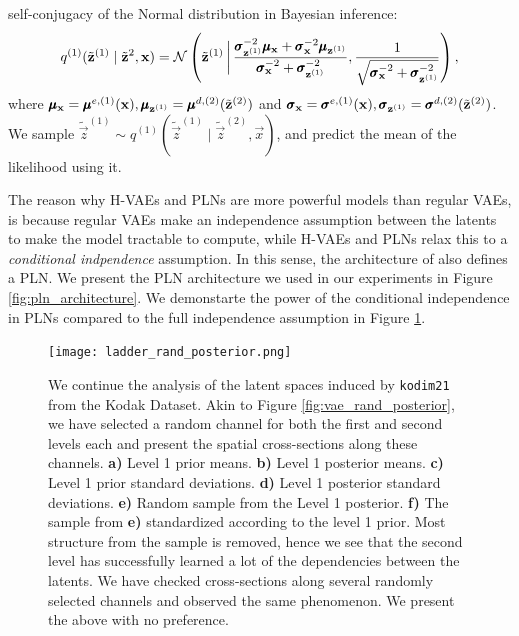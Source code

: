 self-conjugacy of the Normal distribution in Bayesian inference\footnotemark:
\[
  q^{(1)}(\tilde{\mathbf{z}}^{(1)} \mid \tilde{\mathbf{z}}^{2}, \mathbf{x}) =
  \mathcal{N}\left( \tilde{\mathbf{z}}^{(1)} \,\bigg|\,
    \frac{\pmb{\sigma}_{\mathbf{z}^{(1)}}^{-2} \pmb{\mu}_{\mathbf{x}} + \pmb{\sigma}_{\mathbf{x}}^{-2}
      \pmb{\mu}_{\mathbf{z}^{(1)}}}{\pmb{\sigma}_{\mathbf{x}}^{-2} + \pmb{\sigma}_{\mathbf{z}^{(1)}}^{-2}
    },
  \frac{1}{\sqrt{\pmb{\sigma}_{\mathbf{x}}^{-2} + \pmb{\sigma}_{\mathbf{z}^{(1)}}^{-2} }} \right),
\]
where $\pmb{\mu}_{\mathbf{x}} = \pmb{\mu}^{e, (1)}(\mathbf{x}), \pmb{\mu}_{\mathbf{z}^{(1)}} = \pmb{\mu}^{d, (2)}(\tilde{\mathbf{z}}^{(2)})$
and $\pmb{\sigma}_{\mathbf{x}} = \pmb{\sigma}^{e, (1)}(\mathbf{x}), \pmb{\sigma}_{\mathbf{z}^{(1)}} = \pmb{\sigma}^{d, (2)}(\tilde{\mathbf{z}}^{(2)})$.
We sample $\tilde{\vec{z}}^{(1)} \sim q^{(1)}(\tilde{\vec{z}}^{(1)} \mid
\tilde{\vec{z}}^{(2)}, \vec{x})$, and predict the mean of the likelihood using it.
\par 
The reason why H-VAEs and PLNs are more powerful models than regular VAEs, is
because regular VAEs make an independence assumption between the latents to make
the model tractable to compute, while H-VAEs and PLNs relax this to a
\textit{conditional indpendence} assumption. In this sense, the architecture of 
\cite{balle2018variational} also defines a PLN. We present the PLN architecture
we used in our experiments in Figure \ref{fig:pln_architecture}. We demonstarte
the power of the conditional independence in PLNs compared to the full independence
assumption in Figure \ref{fig:ladder_rand_posterior}.


\begin{figure}
  \centering
  \texttt{[image: ladder\_rand\_posterior.png]}
  \caption{We continue the analysis of the latent spaces induced by
    \texttt{kodim21} from the Kodak Dataset. Akin to Figure
    \ref{fig:vae_rand_posterior}, we have selected a random channel for both the
    first and second levels each and present the spatial cross-sections along these
    channels. \textbf{a)} Level 1 prior means. \textbf{b)} Level 1 posterior means.
    \textbf{c)} Level 1 prior standard deviations. \textbf{d)} Level 1 posterior
    standard deviations. \textbf{e)} Random sample from the Level 1 posterior.
    \textbf{f)} The sample from \textbf{e)} standardized according to the level
    1 prior. Most structure from the sample is removed, hence we see that the
    second level has successfully learned a lot of the dependencies between the
    latents. We have checked cross-sections along several randomly selected
    channels and observed the same phenomenon. We present the above with no preference.}
  \label{fig:ladder_rand_posterior}
\end{figure}

